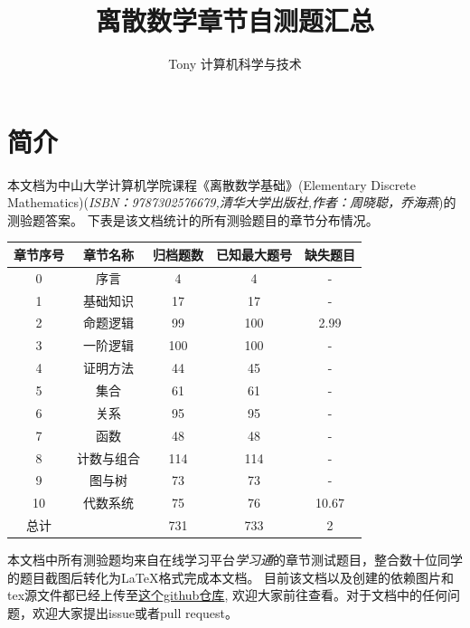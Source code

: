 \documentclass[UTF8, heading=true]{ctexart}
\title{\LARGE \textbf{离散数学章节自测题汇总}}
\author{Tony \hspace{2.89cm} 计算机科学与技术}
\begin{document}
\maketitle



{}
\section*{简介}

本文档为中山大学计算机学院课程《离散数学基础》(Elementary Discrete Mathematics)(\textit{ISBN：9787302576679,清华大学出版社,作者：周晓聪，乔海燕})的测验题答案。
下表是该文档统计的所有测验题目的章节分布情况。
\begin{table}[H]
  \renewcommand{\arraystretch}{1.5}
  \centering
\begin{tabular}{|c|c|c|c|c|}
  \hline 章节序号 & 章节名称 & 归档题数 & 已知最大题号 & 缺失题目 \\
  \hline 0 & 序言 & 4 & 4 & - \\
  \hline 1 & 基础知识 & 17 & 17 & - \\
  \hline 2 & 命题逻辑 & 99 & 100 & 2.99 \\
  \hline 3 & 一阶逻辑 & 100 & 100 & - \\
  \hline 4 & 证明方法 & 44 & 45 & - \\
  \hline 5 & 集合 & 61 & 61 & - \\
  \hline 6 & 关系 & 95 & 95 & - \\
  \hline 7 & 函数 & 48 & 48 & - \\
  \hline 8 & 计数与组合 & 114 & 114 & - \\
  \hline 9 & 图与树 & 73 & 73 & - \\
  \hline 10 & 代数系统 & 75 & 76 & 10.67\\
  \hline 总计& & 731 & 733 & 2 \\
  \hline
  \end{tabular}
\end{table}

本文档中所有测验题均来自在线学习平台\textit{学习通}的章节测试题目，整合数十位同学的题目截图后转化为LaTeX格式完成本文档。
目前该文档以及创建的依赖图片和tex源文件都已经上传至\href{https://github.com/BlackMaple1203/SYSU-Discrete-Mathematics-Exam-Answers}{这个github仓库},
欢迎大家前往查看。对于文档中的任何问题，欢迎大家提出issue或者pull request。
\end{document}
